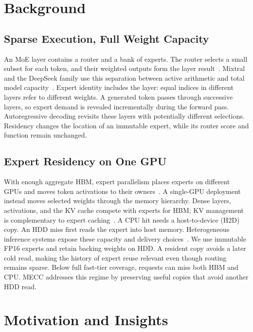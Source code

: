 \documentclass[conference,9pt,letterpaper]{IEEEtran}
\begin{document}
\section{Background}
\label{sec:background}
\subsection{Sparse Execution, Full Weight Capacity}
An MoE layer contains a router and a bank of experts. The router selects a small subset for each token, and their weighted outputs form the layer result~\cite{shazeer,switch,gshard}. Mixtral and the DeepSeek family use this separation between active arithmetic and total model capacity~\cite{mixtral,deepseekmoe,deepseekv2,deepseekv3,mixtral22}. Expert identity includes the layer: equal indices in different layers refer to different weights. A generated token passes through successive layers, so expert demand is revealed incrementally during the forward pass. Autoregressive decoding revisits these layers with potentially different selections. Residency changes the location of an immutable expert, while its router score and function remain unchanged.

\subsection{Expert Residency on One GPU}
With enough aggregate HBM, expert parallelism places experts on different GPUs and moves token activations to their owners~\cite{deepspeedmoe,tutel,megablocks,flashmoedist,harmoeny}. A single-GPU deployment instead moves selected weights through the memory hierarchy. Dense layers, activations, and the KV cache compete with experts for HBM; KV management is complementary to expert caching~\cite{pagedattention,sglang}. A CPU hit needs a host-to-device (H2D) copy. An HDD miss first reads the expert into host memory. Heterogeneous inference systems expose these capacity and delivery choices~\cite{flexgen,dsinference,zeroinfinity,llmflash,powerinfer}. We use immutable FP16 experts and retain backing weights on HDD. A resident copy avoids a later cold read, making the history of expert reuse relevant even though routing remains sparse. Below full fast-tier coverage, requests can miss both HBM and CPU. MECC addresses this regime by preserving useful copies that avoid another HDD read.

\section{Motivation and Insights}
\label{sec:challenges}
\end{document}
